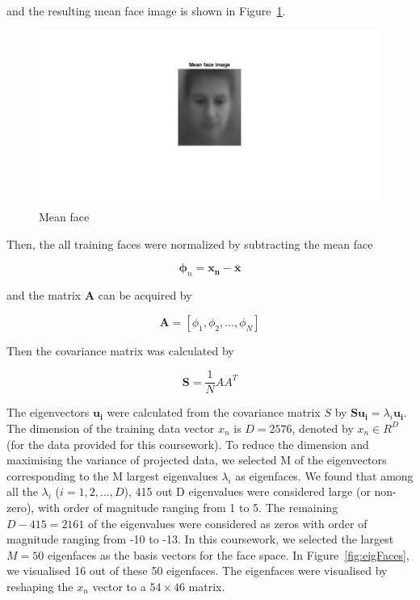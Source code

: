 \documentclass[10pt,twocolumn,letterpaper]{article}
\begin{document}
and the resulting mean face image is shown in Figure~\ref{fig:q1_meanface}. 


\begin{figure}[H]
	\begin{center}
		\includegraphics[width=0.8\linewidth]{q1_meanface}
		\caption{Mean face}
	\end{center}
	\label{fig:q1_meanface}
\end{figure}


Then, the all training faces were normalized by subtracting the mean face

\begin{equation}
\boldsymbol{\phi}_n = \boldsymbol{x_n} - \boldsymbol{\bar{x}}
\label{eq:q1_phi}
\end{equation}

and the matrix $\boldsymbol{A}$ can be acquired by

\begin{equation}
\boldsymbol{A} = [\phi_1, \phi_2, ..., \phi_N]
\label{eq:q1_A}
\end{equation}

Then the covariance matrix was calculated by

\begin{equation}
	\boldsymbol{S} = \frac{1}{N} A A^T
	\label{eq:q1_S}
\end{equation}

The eigenvectors $\boldsymbol{u_i}$ were calculated from the covariance matrix $S$ by $\boldsymbol{S u_i} = \lambda_i \boldsymbol{u_i}$. The dimension of the training data vector $x_n$ is $D = 2576$, denoted by $x_n \in R^D$ (for the data provided for this coursework). To reduce the dimension and maximising the variance of projected data, we selected M of the eigenvectors corresponding to the M largest eigenvalues $\lambda_i$ as eigenfaces. We found that among all the $\lambda_i$ ($i = 1,2, ..., D$), 415 out D eigenvalues were considered large (or non-zero), with order of magnitude ranging from 1 to 5. The remaining $D - 415 = 2161$ of the eigenvalues were considered as zeros with order of magnitude ranging from -10 to -13. In this coursework, we selected the largest $M = 50$ eigenfaces as the basis vectors for the face space. In Figure~\ref{fig:eigFaces}, we visualised 16 out of these 50 eigenfaces. The eigenfaces were visualised by reshaping the $x_n$ vector to a $54 \times 46$ matrix.
\end{document}
